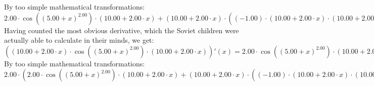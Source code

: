 \documentclass{article}
\begin{document}
\newline
By too simple mathematical transformations:
 ${{{2.00} \cdot { \cos {\left({\left({{5.00} + {x}}\right) ^ {2.00}}\right)}  \cdot \left({{10.00} + {{2.00} \cdot {x}}}\right)}} + {\left({{10.00} + {{2.00} \cdot {x}}}\right) \cdot \left({{\left({-1.00}\right) \cdot {\left({{10.00} + {{2.00} \cdot {x}}}\right) \cdot {\left({{10.00} + {{2.00} \cdot {x}}}\right) \cdot  \sin {\left({\left({{5.00} + {x}}\right) ^ {2.00}}\right)} }}} + {{2.00} \cdot  \cos {\left({\left({{5.00} + {x}}\right) ^ {2.00}}\right)} }}\right)}} = {{{2.00} \cdot { \cos {\left({\left({{5.00} + {x}}\right) ^ {2.00}}\right)}  \cdot \left({{10.00} + {{2.00} \cdot {x}}}\right)}} + {\left({{10.00} + {{2.00} \cdot {x}}}\right) \cdot \left({{\left({-1.00}\right) \cdot {\left({{10.00} + {{2.00} \cdot {x}}}\right) \cdot {\left({{10.00} + {{2.00} \cdot {x}}}\right) \cdot  \sin {\left({\left({{5.00} + {x}}\right) ^ {2.00}}\right)} }}} + {{2.00} \cdot  \cos {\left({\left({{5.00} + {x}}\right) ^ {2.00}}\right)} }}\right)}}$ 
 \newline
 \newline 
Having counted the most obvious derivative, which the Soviet children were actually able to calculate in their minds, we get:
$({\left({{10.00} + {{2.00} \cdot {x}}}\right) \cdot { \cos {\left({\left({{5.00} + {x}}\right) ^ {2.00}}\right)}  \cdot \left({{10.00} + {{2.00} \cdot {x}}}\right)}})'(x) = {{{2.00} \cdot { \cos {\left({\left({{5.00} + {x}}\right) ^ {2.00}}\right)}  \cdot \left({{10.00} + {{2.00} \cdot {x}}}\right)}} + {\left({{10.00} + {{2.00} \cdot {x}}}\right) \cdot \left({{\left({-1.00}\right) \cdot {\left({{10.00} + {{2.00} \cdot {x}}}\right) \cdot {\left({{10.00} + {{2.00} \cdot {x}}}\right) \cdot  \sin {\left({\left({{5.00} + {x}}\right) ^ {2.00}}\right)} }}} + {{2.00} \cdot  \cos {\left({\left({{5.00} + {x}}\right) ^ {2.00}}\right)} }}\right)}}$\newline
\newline
By too simple mathematical transformations:
 ${{2.00} \cdot \left({{{2.00} \cdot { \cos {\left({\left({{5.00} + {x}}\right) ^ {2.00}}\right)}  \cdot \left({{10.00} + {{2.00} \cdot {x}}}\right)}} + {\left({{10.00} + {{2.00} \cdot {x}}}\right) \cdot \left({{\left({-1.00}\right) \cdot {\left({{10.00} + {{2.00} \cdot {x}}}\right) \cdot {\left({{10.00} + {{2.00} \cdot {x}}}\right) \cdot  \sin {\left({\left({{5.00} + {x}}\right) ^ {2.00}}\right)} }}} + {{2.00} \cdot  \cos {\left({\left({{5.00} + {x}}\right) ^ {2.00}}\right)} }}\right)}}\right)} = {{{4.00} \cdot { \cos {\left({\left({{5.00} + {x}}\right) ^ {2.00}}\right)}  \cdot \left({{10.00} + {{2.00} \cdot {x}}}\right)}} + {{2.00} \cdot {\left({{10.00} + {{2.00} \cdot {x}}}\right) \cdot \left({{\left({-1.00}\right) \cdot {\left({{10.00} + {{2.00} \cdot {x}}}\right) \cdot {\left({{10.00} + {{2.00} \cdot {x}}}\right) \cdot  \sin {\left({\left({{5.00} + {x}}\right) ^ {2.00}}\right)} }}} + {{2.00} \cdot  \cos {\left({\left({{5.00} + {x}}\right) ^ {2.00}}\right)} }}\right)}}}$ 
\end{document}
